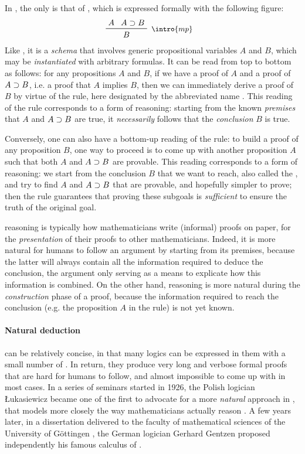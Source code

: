 \AP
In , the only  is that of , which is expressed formally with the following figure:
$$\R[\intro{mp}]{A}{A \limp B}{B}$$
Like , it is a \emph{schema} that involves generic propositional variables
$A$ and $B$, which may be \emph{instantiated} with arbitrary formulas. It can be
read from top to bottom as follows: for any propositions $A$ and $B$, if we have
a proof of $A$ and a proof of $A \supset B$, i.e. a proof that $A$ implies $B$,
then we can immediately derive a proof of $B$ by virtue of the rule, here
designated by the abbreviated name . This reading of the rule
corresponds to a form of  reasoning: starting from the known
\emph{premises} that $A$ and $A \supset B$ are true, it \emph{necessarily} follows
that the \emph{conclusion} $B$ is true.

\AP
Conversely, one can also have a bottom-up reading of the rule: to build a proof
of any proposition $B$, one way to proceed is to come up with another
proposition $A$ such that both $A$ and $A \supset B$ are provable. This reading
corresponds to a form of  reasoning: we start from the conclusion
$B$ that we want to reach, also called the , and try to find
 $A$ and $A \supset B$ that are provable, and hopefully simpler to
prove; then the rule guarantees that proving these subgoals is \emph{sufficient}
to ensure the truth of the original goal.

 reasoning is typically how mathematicians write (informal) proofs on
paper, for the \emph{presentation} of their proofs to other mathematicians.
Indeed, it is more natural for humans to follow an argument by starting from its
premises, because the latter will always contain all the information required to
deduce the conclusion, the argument only serving as a means to explicate how
this information is combined. On the other hand,  reasoning is more
natural during the \emph{construction} phase of a proof, because the information
required to reach the conclusion (e.g. the proposition $A$ in the  rule)
is not yet known.

\paragraph{Natural deduction}

\AP
{} can be relatively concise, in that many logics can be
expressed in them with a small number of . In return, they produce very
long and verbose formal proofs that are hard for humans to follow, and almost
impossible to come up with in most cases. In a series of seminars started in
1926, the Polish logician Łukasiewicz became one of the first to advocate for a
more \emph{natural} approach in , that models more closely the way
mathematicians actually reason . A few years
later, in a dissertation delivered to the faculty of mathematical sciences of
the University of Göttingen , the German
logician Gerhard Gentzen proposed independently his famous calculus of
.

